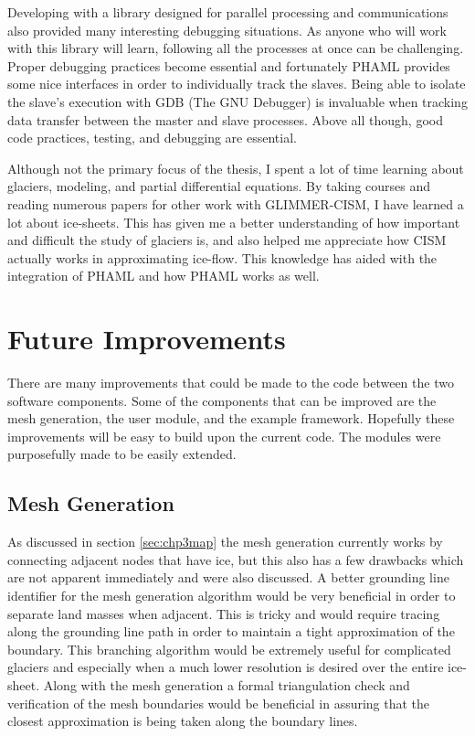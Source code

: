 Developing with a library designed for parallel processing and communications also provided many interesting debugging situations.  As anyone who will work with this library will learn, following all the processes at once can be challenging.  Proper debugging practices become essential and fortunately PHAML provides some nice interfaces in order to individually track the slaves.  Being able to isolate the slave's execution with GDB (The GNU Debugger) is invaluable when tracking data transfer between the master and slave processes.  Above all though, good code practices, testing, and debugging are essential.

Although not the primary focus of the thesis, I spent a lot of time learning about glaciers, modeling, and partial differential equations.  By taking courses and reading numerous papers for other work with GLIMMER-CISM, I have learned a lot about ice-sheets.  This has given me a better understanding of how important and difficult the study of glaciers is, and also helped me appreciate how CISM actually works in approximating ice-flow.  This knowledge has aided with the integration of PHAML and how PHAML works as well.




\section{Future Improvements}\label{sec:chp6improv}

There are many improvements that could be made to the code between the two software components.  Some of the components that can be improved are the mesh generation, the user module, and the example framework.  Hopefully these improvements will be easy to build upon the current code.  The modules were purposefully made to be easily extended.

\subsection{Mesh Generation}
As discussed in section \ref{sec:chp3map} the mesh generation currently works by connecting adjacent nodes that have ice, but this also has a few drawbacks which are not apparent immediately and were also discussed.  A better grounding line identifier for the mesh generation algorithm would be very beneficial in order to separate land masses when adjacent.  This is tricky and would require tracing along the grounding line path in order to maintain a tight approximation of the boundary.  This branching algorithm would be extremely useful for complicated glaciers and especially when a much lower resolution is desired over the entire ice-sheet. Along with the mesh generation a formal triangulation check and verification of the mesh boundaries would be beneficial in assuring that the closest approximation is being taken along the boundary lines.

